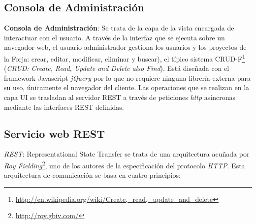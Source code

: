 
\subsection{Consola de Administración}
\label{sub:consola-admin}

\par \textbf{Consola de Administración}: Se trata de la capa de la vista encargada de interactuar con el usuario. A través de la interfaz que se ejecuta sobre un navegador web, el usuario administrador gestiona los usuarios y los proyectos de la Forja: crear, editar, modificar, eliminar y buscar), el típico sistema CRUD-F\footnote{\url{http://en.wikipedia.org/wiki/Create,\_read,\_update\_and\_delete}} (\emph{CRUD: Create, Read, Update and Delete also Find}). Está diseñada con el framework Javascript \emph{jQuery} por lo que no requiere ninguna librería externa para su uso, únicamente el navegador del cliente. Las operaciones que se realizan en la capa UI se trasladan al servidor REST a través de peticiones \emph{http} asíncronas mediante las interfaces REST definidas.



\subsection{Servicio web REST}
\label{sub:rest-ws}

\par \emph{REST}: Representational State Transfer se trata de una arquitectura acuñada por \emph{Roy Fielding}\footnote{\url{http://roy.gbiv.com/}}, uno de los autores de la especificación del protocolo \emph{HTTP}. Esta arquitectura de comunicación se basa en cuatro principios:

